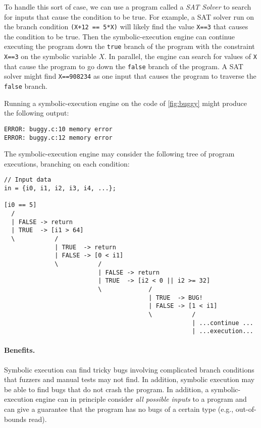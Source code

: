 To handle this sort of case, we can use a program called
a \emph{SAT Solver} to search for inputs that cause the condition
to be true.
For example, a SAT solver run on the branch condition 
\verb|(X+12 == 5*X)| will likely find the value \verb|X==3|
that causes the condition to be true.
Then the symbolic-execution engine can continue executing
the program down the \verb|true| branch of the program
with the constraint \verb|X==3| on the symbolic variable $X$.
In parallel, the engine can search for values of \verb|X|
that cause the program to go down the \verb|false| branch
of the program.
A SAT solver might find \verb|X==908234| as one input
that causes the program to traverse the \verb|false| branch.

Running a symbolic-execution engine on the code of \cref{fig:buggy}
might produce the following output:
\begin{verbatim}
ERROR: buggy.c:10 memory error 
ERROR: buggy.c:12 memory error 
\end{verbatim}

The symbolic-execution engine may consider the following tree 
of program executions, branching on each condition:
\begin{verbatim}
// Input data
in = {i0, i1, i2, i3, i4, ...};

[i0 == 5]
  /
  | FALSE -> return
  | TRUE  -> [i1 > 64]
  \           /
              | TRUE  -> return
              | FALSE -> [0 < i1]
              \           /
                          | FALSE -> return
                          | TRUE  -> [i2 < 0 || i2 >= 32]
                          \             /
                                        | TRUE  -> BUG!
                                        | FALSE -> [1 < i1]
                                        \           /
                                                    | ...continue ...
                                                    | ...execution...
\end{verbatim}

\paragraph{Benefits.}
Symbolic execution can find tricky bugs involving complicated
branch conditions that fuzzers and manual tests may not find.
In addition, symbolic execution may be able to find bugs
that do not crash the program.
In addition, a symbolic-execution engine can in principle
consider \emph{all possible inputs} to a program and can 
give a guarantee that the program has no bugs of a certain
type (e.g., out-of-bounds read).

